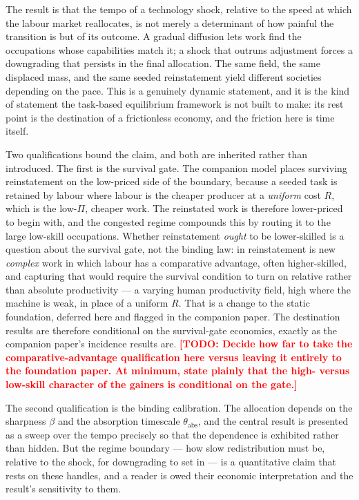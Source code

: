 \documentclass[12pt, a4paper]{article}
\newcommand{\todo}[1]{\textcolor{red}{\textbf{[TODO: #1]}}}
\begin{document}
The result is that the tempo of a technology shock, relative to the speed
at which the labour market reallocates, is not merely a determinant of
how painful the transition is but of its outcome. A gradual diffusion
lets work find the occupations whose capabilities match it; a shock that
outruns adjustment forces a downgrading that persists in the final
allocation. The same field, the same displaced mass, and the same seeded
reinstatement yield different societies depending on the pace. This is a
genuinely dynamic statement, and it is the kind of statement the
task-based equilibrium framework is not built to make: its rest point is
the destination of a frictionless economy, and the friction here is time
itself.

Two qualifications bound the claim, and both are inherited rather than
introduced. The first is the survival gate. The companion model places
surviving reinstatement on the low-priced side of the boundary, because a
seeded task is retained by labour where labour is the cheaper producer at
a \emph{uniform} cost $R$, which is the low-$\Pi$, cheaper work. The
reinstated work is therefore lower-priced to begin with, and the
congested regime compounds this by routing it to the large low-skill
occupations. Whether reinstatement \emph{ought} to be lower-skilled is a
question about the survival gate, not the binding law: in
\textcite{acemoglu2019automation} reinstatement is new \emph{complex}
work in which labour has a comparative advantage, often higher-skilled,
and capturing that would require the survival condition to turn on
relative rather than absolute productivity --- a varying human
productivity field, high where the machine is weak, in place of a uniform
$R$. That is a change to the static foundation, deferred here and flagged
in the companion paper. The destination results are therefore conditional
on the survival-gate economics, exactly as the companion paper's
incidence results are. \todo{Decide how far to take the
comparative-advantage qualification here versus leaving it entirely to
the foundation paper. At minimum, state plainly that the high- versus
low-skill character of the gainers is conditional on the gate.}

The second qualification is the binding calibration. The allocation
depends on the sharpness $\beta$ and the absorption timescale
$\theta_{\text{abs}}$, and the central result is presented as a sweep over
the tempo precisely so that the dependence is exhibited rather than
hidden. But the regime boundary --- how slow redistribution must be,
relative to the shock, for downgrading to set in --- is a quantitative
claim that rests on these handles, and a reader is owed their economic
interpretation and the result's sensitivity to them.
\end{document}
